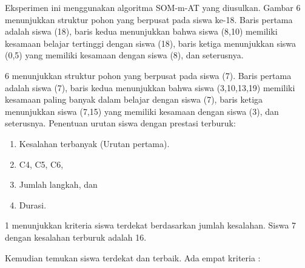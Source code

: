     Eksperimen ini menggunakan algoritma SOM-m-AT yang diusulkan. Gambar 6 menunjukkan struktur pohon yang berpusat pada siswa ke-18. Baris pertama adalah siswa (18), baris kedua menunjukkan bahwa siswa (8,10) memiliki kesamaan belajar tertinggi dengan siswa (18), baris ketiga menunjukkan siswa (0,5) yang memiliki kesamaan dengan siswa (8), dan seterusnya.

    6 menunjukkan struktur pohon yang berpusat pada siswa (7). Baris pertama adalah siswa (7), baris kedua menunjukkan bahwa siswa (3,10,13,19) memiliki kesamaan paling banyak dalam belajar dengan siswa (7), baris ketiga menunjukkan siswa (7,15) yang memiliki kesamaan dengan siswa (3), dan seterusnya. Penentuan urutan siswa dengan prestasi terburuk:

    \begin{enumerate}
        \item Kesalahan terbanyak (Urutan pertama).
        \item C4, C5, C6,
        \item Jumlah langkah, dan
        \item Durasi.
    \end{enumerate}

    1 menunjukkan kriteria siswa terdekat berdasarkan jumlah kesalahan. Siswa 7 dengan kesalahan terburuk adalah 16.
    
    Kemudian temukan siswa terdekat dan terbaik. Ada empat kriteria :

